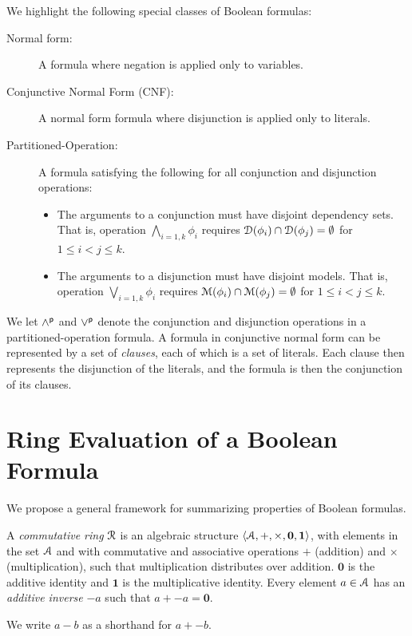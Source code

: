 \documentclass[letterpaper,USenglish,cleveref, autoref, thm-restate]{lipics-v2021}
\newcommand{\pand}{\mathbin{\land^{\sf p}}}
\newcommand{\por}{\mathbin{\lor^{\sf p}}}
\newcommand{\dependencyset}{{\cal D}}
\newcommand{\ring}{{\cal R}}
\newcommand{\dset}{{\cal A}}
\newcommand{\radd}{+}
\newcommand{\rmul}{\times}
\newcommand{\addident}{\textbf{0}}
\newcommand{\mulident}{\textbf{1}}
\newcommand{\modelset}{{\cal M}}
\begin{document}
  We highlight the following special classes of Boolean formulas:
  \begin{description}
    \item[Normal form:] A formula where negation is applied only to variables.
    \item[Conjunctive Normal Form (CNF):] A normal form formula where  disjunction is applied only to literals.
    \item[Partitioned-Operation:] A formula satisfying the following for all conjunction and disjunction operations: 
      \begin{itemize}
      \item The arguments to a conjunction must have disjoint dependency sets.  That is, operation
        $\bigwedge_{i=1,k} \phi_i$ requires $\dependencyset(\phi_i) \cap \dependencyset(\phi_j) = \emptyset$ for $1 \leq i < j \leq k$.
      \item The arguments to a disjunction must have disjoint models.  That is, operation
        $\bigvee_{i=1,k} \phi_i$ requires $\modelset(\phi_i) \cap \modelset(\phi_j) = \emptyset$ for $1 \leq i < j \leq k$.
      \end{itemize}
  \end{description}
     We let $\pand$ and $\por$ denote the conjunction and disjunction operations in a partitioned-operation formula.
     A formula in conjunctive normal form can be represented by a set
     of {\em clauses}, each of which is a set of literals.  Each
     clause then represents the disjunction of the literals, and the formula is then the conjunction of its clauses.
  
  \section{Ring Evaluation of a Boolean Formula}

We propose a general framework for 
summarizing properties of Boolean formulas.

\begin{definition}
  A {\em commutative ring} $\ring$ is an algebraic structure
  $\langle \dset, \radd, \rmul, \addident, \mulident \rangle$, 
  with elements in the set $\dset$ and with commutative and
  associative operations $\radd$ (addition) and $\rmul$ (multiplication),
  such that multiplication distributes
  over addition.  $\addident$ is the additive identity and $\mulident$ is
  the multiplicative identity.  Every element $a \in \dset$ has an
  {\em additive inverse} $-a$ such that $a + -a = \addident$.
\label{def:ring}
\end{definition}
We write $a - b$ as a shorthand for $a + -b$.
\end{document}
